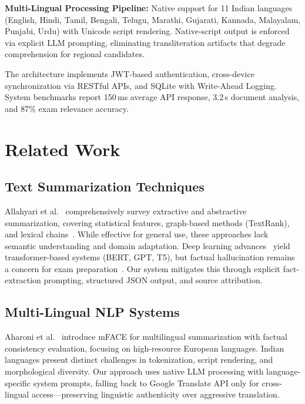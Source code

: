 \documentclass[conference]{IEEEtran}
\begin{document}
\textbf{Multi-Lingual Processing Pipeline:} Native support for 11 Indian languages (English, Hindi, Tamil, Bengali, Telugu, Marathi, Gujarati, Kannada, Malayalam, Punjabi, Urdu) with Unicode script rendering. Native-script output is enforced via explicit LLM prompting, eliminating transliteration artifacts that degrade comprehension for regional candidates.

The architecture implements JWT-based authentication, cross-device synchronization via RESTful APIs, and SQLite with Write-Ahead Logging. System benchmarks report 150\,ms average API response, 3.2\,s document analysis, and 87\% exam relevance accuracy.

\section{Related Work}

\subsection{Text Summarization Techniques}
Allahyari et al.~\cite{allahyari2017text} comprehensively survey extractive and abstractive summarization, covering statistical features, graph-based methods (TextRank), and lexical chains~\cite{alam2003structured}. While effective for general use, these approaches lack semantic understanding and domain adaptation. Deep learning advances~\cite{alomari2022deep} yield transformer-based systems (BERT, GPT, T5), but factual hallucination remains a concern for exam preparation~\cite{cao2022hallucinated}. Our system mitigates this through explicit fact-extraction prompting, structured JSON output, and source attribution.

\subsection{Multi-Lingual NLP Systems}
Aharoni et al.~\cite{aharoni2022mface} introduce mFACE for multilingual summarization with factual consistency evaluation, focusing on high-resource European languages. Indian languages present distinct challenges in tokenization, script rendering, and morphological diversity. Our approach uses native LLM processing with language-specific system prompts, falling back to Google Translate API only for cross-lingual access—preserving linguistic authenticity over aggressive translation.
\end{document}
